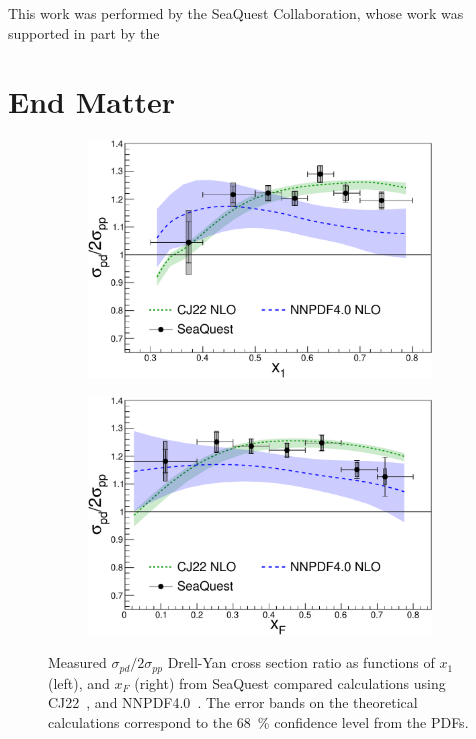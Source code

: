 \documentclass[reprint,aps,unsortedaddress,superscriptaddress,prl,floatfix,showpacs,linenumbers]{revtex4-2}
\begin{document}
\begin{acknowledgments}
	This work was performed by the SeaQuest Collaboration, whose work was supported in part by the
\end{acknowledgments}


\clearpage
\onecolumngrid
\appendix
\section{End Matter}

\begin{figure}[htbp!]
	\begin{subfigure}{0.45\linewidth}
		\includegraphics[width=\linewidth]{data_full_xB_syst.pdf}
	\end{subfigure}
	\begin{subfigure}{0.45\linewidth}
		\includegraphics[width=\linewidth]{data_full_xF_syst.pdf}
	\end{subfigure}
	\caption{Measured $\sigma_{pd}/2\sigma_{pp}$ Drell-Yan cross section ratio as functions of $x_1$ (left), and $x_F$ (right) 
		from SeaQuest compared calculations using
		CJ22~\cite{accardi2023}, and NNPDF4.0~\cite{ball2022a}.
		The error bands on the theoretical calculations correspond to the \SI{68}{\percent} confidence level from the PDFs.}
	\label{fig:csr_x1_xF}
\end{figure}
\end{document}
